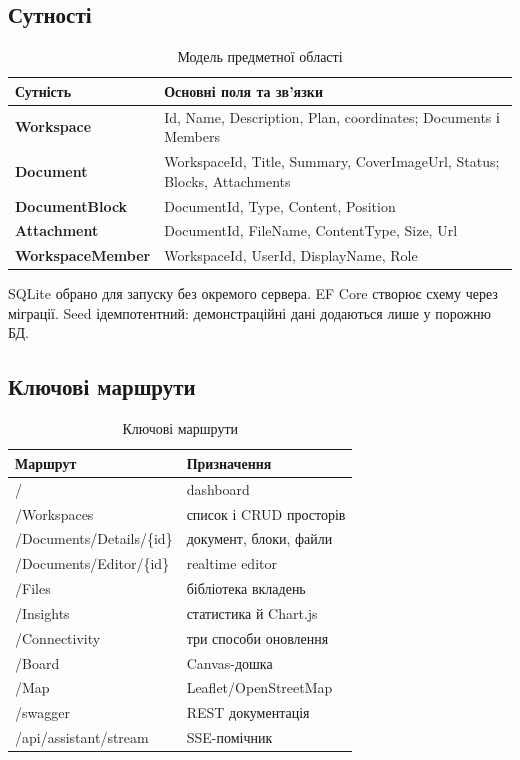\documentclass[12pt,a4paper]{article}
\begin{document}
\subsection{Сутності}
\begin{table}[H]\centering\small
\begin{tabularx}{\textwidth}{>{\bfseries}p{} X}
\toprule Сутність & Основні поля та зв'язки \\
\midrule
Workspace & Id, Name, Description, Plan, coordinates; Documents і Members \\
Document & WorkspaceId, Title, Summary, CoverImageUrl, Status; Blocks, Attachments \\
DocumentBlock & DocumentId, Type, Content, Position \\
Attachment & DocumentId, FileName, ContentType, Size, Url \\
WorkspaceMember & WorkspaceId, UserId, DisplayName, Role \\
\bottomrule\end{tabularx}\caption{Модель предметної області}\end{table}

SQLite обрано для запуску без окремого сервера. EF Core створює схему через
міграції. Seed ідемпотентний: демонстраційні дані додаються лише у порожню БД.

\subsection{Ключові маршрути}
\begin{table}[H]\centering\small
\begin{tabularx}{\textwidth}{>{\ttfamily}p{} X}
\toprule Маршрут & Призначення \\
\midrule
/ & dashboard \\
/Workspaces & список і CRUD просторів \\
/Documents/Details/\{id\} & документ, блоки, файли \\
/Documents/Editor/\{id\} & realtime editor \\
/Files & бібліотека вкладень \\
/Insights & статистика й Chart.js \\
/Connectivity & три способи оновлення \\
/Board & Canvas-дошка \\
/Map & Leaflet/OpenStreetMap \\
/swagger & REST документація \\
/api/assistant/stream & SSE-помічник \\
\bottomrule\end{tabularx}\caption{Ключові маршрути}\end{table}
\end{document}
